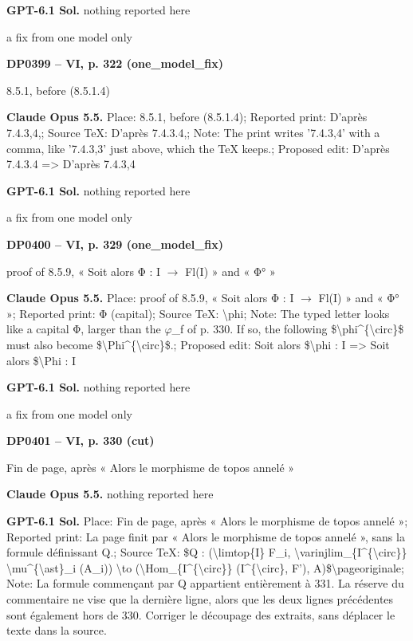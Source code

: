 \textbf{GPT-6.1 Sol.} nothing reported here\par
a fix from one model only\par
\par\noindent\hypertarget{DP0399}{}\textbf{DP0399 -- VI, p. 322 (one\_model\_fix)}\par
8.5.1, before (8.5.1.4)\par
\textbf{Claude Opus 5.5.} Place: 8.5.1, before (8.5.1.4); Reported print: D'après 7.4.3,4,; Source TeX: D'après 7.4.3.4,; Note: The print writes '7.4.3,4' with a comma, like '7.4.3,3' just above, which the TeX keeps.; Proposed edit: D'après 7.4.3.4 =\allowbreak > D'après 7.4.3,4\par
\textbf{GPT-6.1 Sol.} nothing reported here\par
a fix from one model only\par
\par\noindent\hypertarget{DP0400}{}\textbf{DP0400 -- VI, p. 329 (one\_model\_fix)}\par
proof of 8.5.9, « Soit alors Φ : I \ensuremath{\to} Fl(I) » and « Φ° »\par
\textbf{Claude Opus 5.5.} Place: proof of 8.5.9, « Soit alors Φ : I \ensuremath{\to} Fl(I) » and « Φ° »; Reported print: Φ (capital); Source TeX: \textbackslash{}phi; Note: The typed letter looks like a capital Φ, larger than the \ensuremath{\varphi}\_f of p. 330. If so, the following \$\textbackslash{}phi\textasciicircum{}\{\textbackslash{}circ\}\$ must also become \$\textbackslash{}Phi\textasciicircum{}\{\textbackslash{}circ\}\$.; Proposed edit: Soit alors \$\textbackslash{}phi : I =\allowbreak > Soit alors \$\textbackslash{}Phi : I\par
\textbf{GPT-6.1 Sol.} nothing reported here\par
a fix from one model only\par
\par\noindent\hypertarget{DP0401}{}\textbf{DP0401 -- VI, p. 330 (cut)}\par
Fin de page, après « Alors le morphisme de topos annelé »\par
\textbf{Claude Opus 5.5.} nothing reported here\par
\textbf{GPT-6.1 Sol.} Place: Fin de page, après « Alors le morphisme de topos annelé »; Reported print: La page finit par « Alors le morphisme de topos annelé », sans la formule définissant Q.; Source TeX: \$Q : (\textbackslash{}limtop\{I\} F\_i, \textbackslash{}varinjlim\_\{I\textasciicircum{}\{\textbackslash{}circ\}\} \textbackslash{}mu\textasciicircum{}\{\textbackslash{}ast\}\_i (A\_i)) \textbackslash{}to (\textbackslash{}Hom\_\{I\textasciicircum{}\{\textbackslash{}circ\}\} (I\textasciicircum{}\{\textbackslash{}circ\}, F'), A)\$\textbackslash{}pageoriginale; Note: La formule commençant par Q appartient entièrement à 331. La réserve du commentaire ne vise que la dernière ligne, alors que les deux lignes précédentes sont également hors de 330. Corriger le découpage des extraits, sans déplacer le texte dans la source.\par
